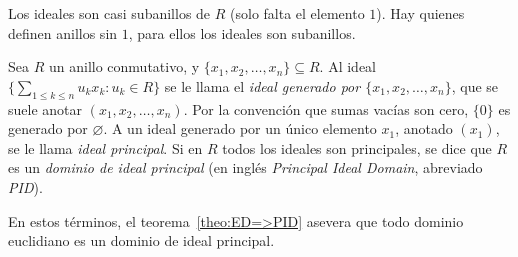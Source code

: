   Los ideales son casi subanillos de \(R\)
  (solo falta el elemento \(1\)).
  Hay quienes definen anillos sin \(1\),
  para ellos los ideales son subanillos.
  \begin{definition}
    Sea \(R\) un anillo conmutativo,
    y \(\{x_1, x_2, \dotsc, x_n\} \subseteq R\).
    Al ideal
      \(\{\sum_{1 \le k \le n} u_k x_k \colon u_k \in R\}\)
    se le llama
    el \emph{ideal generado por \(\{x_1, x_2, \dotsc, x_n\}\)},
    que se suele anotar \((x_1, x_2, \dotsc, x_n)\).
    Por la convención que sumas vacías son cero,
    \(\{0\}\) es generado por \(\varnothing\).
    A un ideal generado por un único elemento \(x_1\),
    anotado \((x_1)\),
    se le llama \emph{ideal principal}.
    Si en \(R\) todos los ideales son principales,
    se dice que \(R\) es un \emph{dominio de ideal principal}
    (en inglés
     \emph{\foreignlanguage{english}{Principal Ideal Domain}},
     abreviado \emph{PID}).
  \end{definition}
  En estos términos,
  el teorema~\ref{theo:ED=>PID} asevera que todo dominio euclidiano
  es un dominio de ideal principal.

